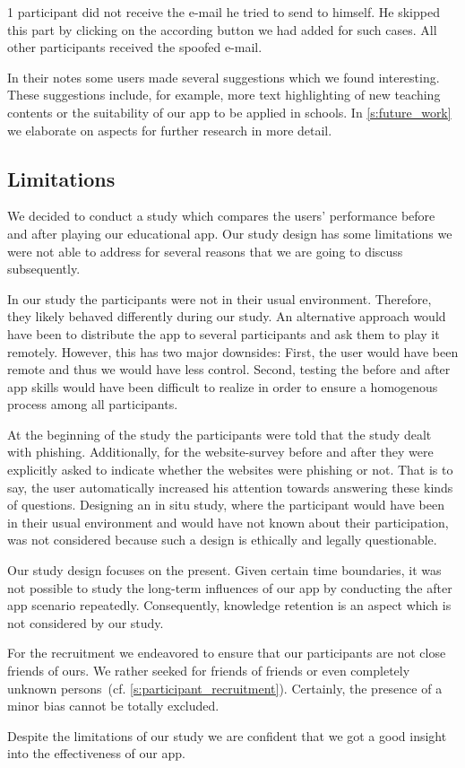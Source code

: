 \begin{description}[leftmargin=0cm]
1 participant did not receive the e-mail he tried to send to himself.
He skipped this part by clicking on the according button we had added for such cases.
All other participants received the spoofed e-mail.
	\item[Further Suggestions:] In their notes some users made several suggestions which we found interesting.
These suggestions include, for example, more text highlighting of new teaching contents or the suitability of our app to be applied in schools.
In \autoref{s:future_work} we elaborate on aspects for further research in more detail.
\end{description}

\subsection{Limitations}
We decided to conduct a study which compares the users' performance before and after playing our educational app.
Our study design has some limitations we were not able to address for several reasons that we are going to discuss subsequently.

\begin{description}[leftmargin=0cm]
	\item[Behavior Change:] In our study the participants were not in their usual environment. 
	Therefore, they likely behaved differently during our study.
	An alternative approach would have been to distribute the app to several participants and ask them to play it remotely.
	However, this has two major downsides: First, the user would have been remote and thus we would have less control.
	Second, testing the before and after app skills would have been difficult to realize in order to ensure a homogenous process among all participants.
	\item[Increased Attention:] At the beginning of the study the participants were told that the study dealt with phishing.
	Additionally, for the website-survey before and after they were explicitly asked to indicate whether the websites were phishing or not.
	That is to say, the user automatically increased his attention towards answering these kinds of questions.
	Designing an in situ study, where the participant would have been in their usual environment and would have not known about their participation, was not considered because such a design is ethically and legally questionable. 
	\item[Knowledge Retention:] Our study design focuses on the present.
	Given certain time boundaries, it was not possible to study the long-term influences of our app by conducting the after app scenario repeatedly. 
	Consequently, knowledge retention is an aspect which is not considered by our study.
	\item[Bias:] For the recruitment we endeavored to ensure that our participants are not close friends of ours. 
	We rather seeked for friends of friends or even completely unknown persons~(cf. \autoref{s:participant_recruitment}).
	Certainly, the presence of a minor bias cannot be totally excluded.
\end{description}
Despite the limitations of our study we are confident that we got a good insight into the effectiveness of our app.

